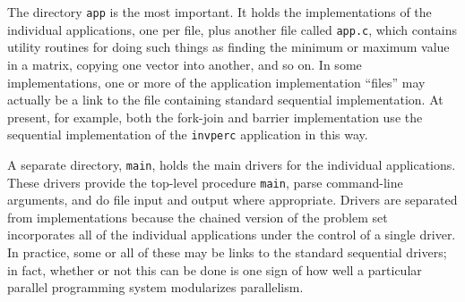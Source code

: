 The directory {\tt{app}} is the most important.
It holds the implementations of the individual applications,
one per file,
plus another file called {\tt{app.c}},
which contains utility routines for doing such things as
finding the minimum or maximum value in a matrix,
copying one vector into another,
and so on.
In some implementations,
one or more of the application implementation ``files''
may actually be a link to the file containing standard sequential implementation.
At present,
for example,
both the fork-join and barrier implementation
use the sequential implementation of the {\tt{invperc}} application
in this way.

A separate directory,
{\tt{main}},
holds the main drivers for the individual applications.
These drivers provide the top-level procedure {\tt{main}},
parse command-line arguments,
and do file input and output where appropriate.
Drivers are separated from implementations because
the chained version of the problem set
incorporates all of the individual applications
under the control of a single driver.
In practice,
some or all of these may be links to the standard sequential drivers;
in fact,
whether or not this can be done is one sign of
how well a particular parallel programming system
modularizes parallelism.

